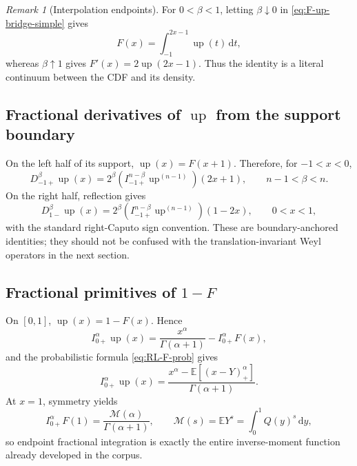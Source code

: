 \documentclass[11pt,oneside]{article}
\numberwithin{equation}{section}
\theoremstyle{plain}
\theoremstyle{definition}
\theoremstyle{remark}
\newtheorem{remark}[theorem]{Remark}
\newcommand{\E}{\mathbb E}
\newcommand{\Up}{\operatorname{up}}
\newcommand{\dd}{\,\mathrm d}
\newcommand{\Mell}{\mathcal M}
\begin{document}
\begin{remark}[Interpolation endpoints]
For $0<\beta<1$, letting $\beta\downarrow0$ in
\cref{eq:F-up-bridge-simple} gives
\[
 F(x)=\int_{-1}^{2x-1}\Up(t)\dd t,
\]
whereas $\beta\uparrow1$ gives $F'(x)=2\Up(2x-1)$.  Thus the identity is a
literal continuum between the CDF and its density.
\end{remark}

\subsection{Fractional derivatives of \texorpdfstring{$\Up$}{up} from the support boundary}

On the left half of its support, $\Up(x)=F(x+1)$.  Therefore, for
$-1<x<0$,
\begin{equation}
 D_{-1+}^\beta\Up(x)
 =2^\beta
  \left(I_{-1+}^{n-\beta}\Up^{(n-1)}\right)(2x+1),
 \qquad n-1<\beta<n.
 \label{eq:up-left-fractional}
\end{equation}
On the right half, reflection gives
\begin{equation}
 D_{1-}^\beta\Up(x)
 =2^\beta
  \left(I_{-1+}^{n-\beta}\Up^{(n-1)}\right)(1-2x),
 \qquad 0<x<1,
 \label{eq:up-right-fractional}
\end{equation}
with the standard right-Caputo sign convention.  These are boundary-anchored
identities; they should not be confused with the translation-invariant Weyl
operators in the next section.

\subsection{Fractional primitives of \texorpdfstring{$1-F$}{1-F}}

On $[0,1]$, $\Up(x)=1-F(x)$.  Hence
\begin{equation}
 I_{0+}^\alpha\Up(x)
 =\frac{x^\alpha}{\Gamma(\alpha+1)}-I_{0+}^\alpha F(x),
 \label{eq:half-up-RL}
\end{equation}
and the probabilistic formula \cref{eq:RL-F-prob} gives
\begin{equation}
 I_{0+}^\alpha\Up(x)
 =\frac{x^\alpha-\E[(x-Y)_+^\alpha]}{\Gamma(\alpha+1)}.
 \label{eq:half-up-truncated}
\end{equation}
At $x=1$, symmetry yields
\begin{equation}
 I_{0+}^\alpha F(1)
 =\frac{\Mell(\alpha)}{\Gamma(\alpha+1)},
 \qquad
 \Mell(s)=\E Y^s=\int_0^1Q(y)^s\dd y,
 \label{eq:RL-endpoint-Mellin}
\end{equation}
so endpoint fractional integration is exactly the entire inverse-moment
function already developed in the corpus.
\end{document}
